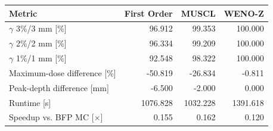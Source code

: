 \begin{tabular}{lrrr}
\toprule
Metric & First Order & MUSCL & WENO-Z \\
\midrule
$\gamma$ 3\%/3 mm [\%] & 96.912 & 99.353 & 100.000 \\
$\gamma$ 2\%/2 mm [\%] & 96.334 & 99.209 & 100.000 \\
$\gamma$ 1\%/1 mm [\%] & 92.548 & 98.322 & 100.000 \\
Maximum-dose difference [\%] & -50.819 & -26.834 & -0.811 \\
Peak-depth difference [mm] & -6.500 & -2.000 & 0.000 \\
Runtime [s] & 1076.828 & 1032.228 & 1391.618 \\
Speedup vs. BFP MC [$\times$] & 0.155 & 0.162 & 0.120 \\
\bottomrule
\end{tabular}
